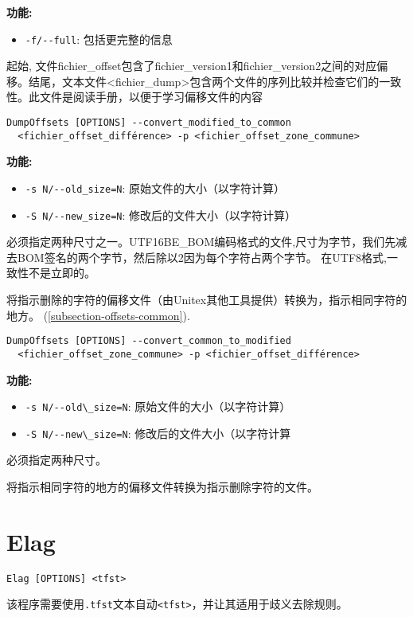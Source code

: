 \noindent \textbf{功能:}
\begin{itemize}
\item \verb+-f/--full+: 包括更完整的信息
\end{itemize}
起始, 文件fichier\_offset包含了fichier\_version1和fichier\_version2之间的对应偏移。结尾，文本文件<fichier\_dump>包含两个文件的序列比较并检查它们的一致性。此文件是阅读手册，以便于学习偏移文件的内容



\bigskip
\begin{verbatim}
DumpOffsets [OPTIONS] --convert_modified_to_common 
  <fichier_offset_différence> -p <fichier_offset_zone_commune>
\end{verbatim}
\bigskip

\noindent \textbf{功能:}
\begin{itemize}
\item \verb+-s N/--old_size=N+: 原始文件的大小（以字符计算）
\item \verb+-S N/--new_size=N+: 修改后的文件大小（以字符计算）
\end{itemize}
必须指定两种尺寸之一。UTF16BE\_BOM编码格式的文件,尺寸为字节，我们先减去BOM签名的两个字节，然后除以2因为每个字符占两个字节。 在UTF8格式,一致性不是立即的。 

将指示删除的字符的偏移文件（由Unitex其他工具提供）转换为，指示相同字符的地方。 (\ref{subsection-offsets-common}).

\bigskip
\begin{verbatim}
DumpOffsets [OPTIONS] --convert_common_to_modified
  <fichier_offset_zone_commune> -p <fichier_offset_différence>
\end{verbatim}
\bigskip

\noindent \textbf{功能:}
\begin{itemize}
\item \verb+-s N/--old\_size=N+: 原始文件的大小（以字符计算）
\item \verb+-S N/--new\_size=N+: 修改后的文件大小（以字符计算
\end{itemize}
必须指定两种尺寸。

将指示相同字符的地方的偏移文件转换为指示删除字符的文件。



\section{Elag}
\verb+Elag [OPTIONS] <tfst>+

\bigskip
\noindent 该程序需要使用\verb+.tfst+文本自动\verb+<tfst>+，并让其适用于歧义去除规则。 

